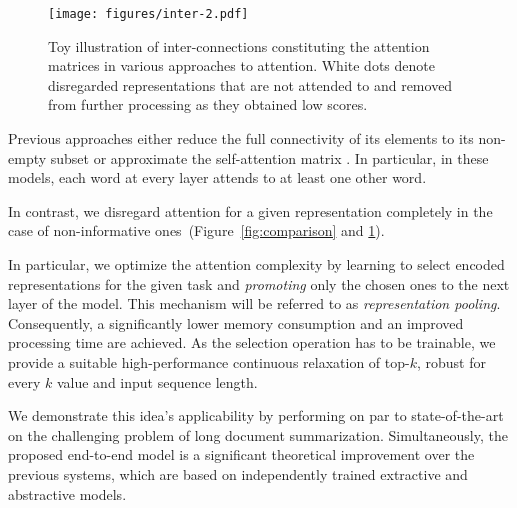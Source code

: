 \documentclass{article}
\begin{document}
\begin{figure}
    \centering
\vspace{-15mm}
        \centering
        \texttt{[image: figures/inter-2.pdf]}
        \caption{Toy illustration of inter-connections constituting the attention matrices in various approaches to attention. White dots denote disregarded representations that are not attended to and removed from further processing as they obtained low scores.}

        \label{fig:inter}
\end{figure}

 Previous approaches either reduce the full connectivity of its elements to its non-empty subset or approximate the self-attention matrix \citep{Dai2019TransformerXLAL,Beltagy2020LongformerTL,Kitaev2020ReformerTE,tay2020sparse,zaheer2020big,wang2020linformer,shen2021efficient,choromanski2021rethinking,roy2020efficient}. In particular, in these models, each word at every layer attends to at least one other word.

In contrast, we disregard attention for a given representation completely in the case of non-informative ones~(Figure~\ref{fig:comparison} and \ref{fig:inter}).

In particular, we optimize the attention complexity by learning to select encoded representations for the given task and \textit{promoting} only the chosen ones to the next layer of the model. This mechanism will be referred to as \textit{representation pooling}. Consequently, a significantly lower memory consumption and an improved processing time are achieved. As the selection operation has to be trainable, we provide a suitable high-performance continuous relaxation of top-$k$, robust for every $k$ value and input sequence length. 

We demonstrate this idea's applicability by performing on par to state-of-the-art on the challenging problem of long document summarization. Simultaneously, the proposed end-to-end model is a significant theoretical improvement over the previous systems, which are based on independently trained extractive and abstractive models.
\end{document}
